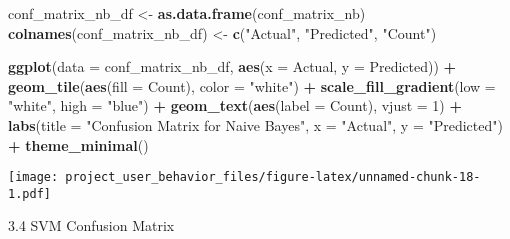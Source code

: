 \documentclass[
]{article}
\newenvironment{Shaded}{\begin{snugshade}}{\end{snugshade}}
\newcommand{\AttributeTok}[1]{\textcolor[rgb]{0.13,0.29,0.53}{#1}}
\newcommand{\DecValTok}[1]{\textcolor[rgb]{0.00,0.00,0.81}{#1}}
\newcommand{\FunctionTok}[1]{\textcolor[rgb]{0.13,0.29,0.53}{\textbf{#1}}}
\newcommand{\NormalTok}[1]{#1}
\newcommand{\OtherTok}[1]{\textcolor[rgb]{0.56,0.35,0.01}{#1}}
\newcommand{\SpecialCharTok}[1]{\textcolor[rgb]{0.81,0.36,0.00}{\textbf{#1}}}
\newcommand{\StringTok}[1]{\textcolor[rgb]{0.31,0.60,0.02}{#1}}
\begin{document}
\begin{Shaded}
\begin{Highlighting}[]
\NormalTok{conf\_matrix\_nb\_df }\OtherTok{\textless{}{-}} \FunctionTok{as.data.frame}\NormalTok{(conf\_matrix\_nb)}
\FunctionTok{colnames}\NormalTok{(conf\_matrix\_nb\_df) }\OtherTok{\textless{}{-}} \FunctionTok{c}\NormalTok{(}\StringTok{"Actual"}\NormalTok{, }\StringTok{"Predicted"}\NormalTok{, }\StringTok{"Count"}\NormalTok{)}

\FunctionTok{ggplot}\NormalTok{(}\AttributeTok{data =}\NormalTok{ conf\_matrix\_nb\_df, }\FunctionTok{aes}\NormalTok{(}\AttributeTok{x =}\NormalTok{ Actual, }\AttributeTok{y =}\NormalTok{ Predicted)) }\SpecialCharTok{+}
  \FunctionTok{geom\_tile}\NormalTok{(}\FunctionTok{aes}\NormalTok{(}\AttributeTok{fill =}\NormalTok{ Count), }\AttributeTok{color =} \StringTok{"white"}\NormalTok{) }\SpecialCharTok{+}
  \FunctionTok{scale\_fill\_gradient}\NormalTok{(}\AttributeTok{low =} \StringTok{"white"}\NormalTok{, }\AttributeTok{high =} \StringTok{"blue"}\NormalTok{) }\SpecialCharTok{+}
  \FunctionTok{geom\_text}\NormalTok{(}\FunctionTok{aes}\NormalTok{(}\AttributeTok{label =}\NormalTok{ Count), }\AttributeTok{vjust =} \DecValTok{1}\NormalTok{) }\SpecialCharTok{+}
  \FunctionTok{labs}\NormalTok{(}\AttributeTok{title =} \StringTok{"Confusion Matrix for Naive Bayes"}\NormalTok{, }\AttributeTok{x =} \StringTok{"Actual"}\NormalTok{, }\AttributeTok{y =} \StringTok{"Predicted"}\NormalTok{) }\SpecialCharTok{+}
  \FunctionTok{theme\_minimal}\NormalTok{()}
\end{Highlighting}
\end{Shaded}

\texttt{[image: project\_user\_behavior\_files/figure-latex/unnamed-chunk-18-1.pdf]}

3.4 SVM Confusion Matrix
\end{document}
